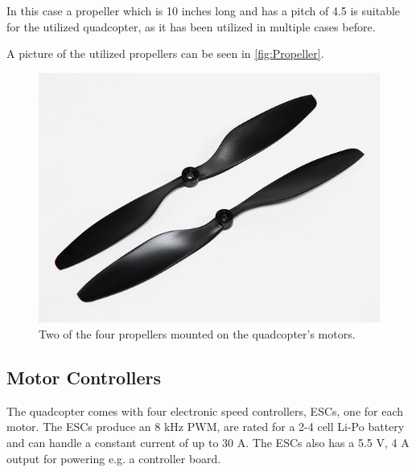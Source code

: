 In this case a propeller which is 10 inches long and has a pitch of 4.5 is suitable for the utilized quadcopter, as it has been utilized in multiple cases before. 

A picture of the utilized propellers can be seen in \autoref{fig:Propeller}.

\begin{figure}[H]
	\centering
	\includegraphics[scale=0.4]{figures/propeller.png}
	\caption{Two of the four propellers mounted on the quadcopter's motors.}
	\label{fig:Propeller}
\end{figure}


 
\subsection{Motor Controllers}
The quadcopter comes with four electronic speed controllers, ESCs, one for each motor. The ESCs produce an 8 kHz PWM, are rated for a 2-4 cell Li-Po battery and can handle a constant current of up to 30 A. The ESCs also has a 5.5 V, 4 A output for powering e.g. a controller board.\cite{HKing}

